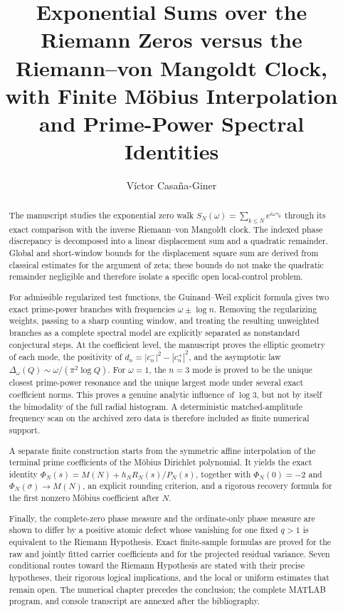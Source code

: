 \documentclass[11pt]{amsart}
\title[Exponential Zeta Walks and Prime-Power Identities]{
Exponential Sums over the Riemann Zeros versus the
Riemann--von Mangoldt Clock, with Finite Möbius Interpolation
and Prime-Power Spectral Identities
}
\author{Víctor Casaña-Giner}
\date{}
\numberwithin{equation}{section}
\theoremstyle{plain}
\theoremstyle{definition}
\theoremstyle{remark}
\newcommand{\1}{\mathbf{1}}
\begin{document}
\begin{abstract}
The manuscript studies the exponential zero walk
\(S_N(\omega)=\sum_{k\leq N}e^{i\omega\gamma_k}\) through its exact
comparison with the inverse Riemann--von Mangoldt clock.  The indexed phase
discrepancy is decomposed into a linear displacement sum and a quadratic
remainder.  Global and short-window bounds for the displacement square sum
are derived from classical estimates for the argument of zeta; these bounds
do not make the quadratic remainder negligible and therefore isolate a
specific open local-control problem.

For admissible regularized test functions, the Guinand--Weil explicit formula
gives two exact prime-power branches with frequencies
\(\omega\pm\log n\).  Removing the regularizing weights, passing to a sharp
counting window, and treating the resulting unweighted branches as a complete
spectral model are explicitly separated as nonstandard conjectural steps.  At
the coefficient level, the manuscript proves the elliptic geometry of each
mode, the positivity of
\(d_n=|c_n^-|^2-|c_n^+|^2\), and the asymptotic law
\(\Delta_\omega(Q)\sim\omega/(\pi^2\log Q)\).  For \(\omega=1\), the
\(n=3\) mode is proved to be the unique closest prime-power resonance and
the unique largest mode under several exact coefficient norms.  This proves
a genuine analytic influence of \(\log3\), but not by itself the bimodality
of the full radial histogram.  A deterministic matched-amplitude frequency
scan on the archived zero data is therefore included as finite numerical
support.

A separate finite construction starts from the symmetric affine interpolation
of the terminal prime coefficients of the Möbius Dirichlet polynomial.  It yields the exact identity
\(\Phi_N(s)=M(N)+h_NR_N(s)/P_N(s)\), together with
\(\Phi_N(0)=-2\) and \(\Phi_N(\sigma)\to M(N)\), an explicit
rounding criterion, and a rigorous recovery formula
for the first nonzero Möbius coefficient after \(N\).

Finally, the complete-zero phase measure and the ordinate-only phase measure
are shown to differ by a positive atomic defect whose vanishing for one fixed
\(q>1\) is equivalent to the Riemann Hypothesis.  Exact finite-sample formulas
are proved for the raw and jointly fitted carrier coefficients and for the
projected residual variance.  Seven conditional routes toward the Riemann
Hypothesis are stated with their precise hypotheses, their rigorous logical
implications, and the local or uniform estimates that remain open.  The
numerical chapter precedes the conclusion; the complete MATLAB program,
and console transcript are annexed after the bibliography.
\end{abstract}
\end{document}
